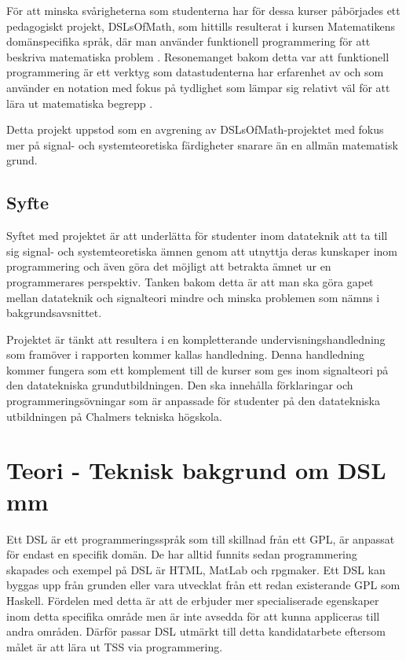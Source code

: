 \documentclass[]{article}
\begin{document}
För att minska svårigheterna som studenterna har för dessa kurser påbörjades
ett pedagogiskt projekt, DSLsOfMath, som hittills resulterat i kursen
Matematikens domänspecifika språk, där man använder funktionell
programmering för att beskriva matematiska problem \cite{kursplan:dslsofmath}.
Resonemanget bakom detta var att funktionell programmering är ett verktyg
som datastudenterna har erfarenhet av och som använder en notation med
fokus på tydlighet som lämpar sig relativt väl för att lära ut matematiska
begrepp \cite{TFPIE15_DSLsofMath_IonescuJansson}.

Detta projekt uppstod som en avgrening av DSLsOfMath-projektet med fokus mer på signal- och systemteoretiska färdigheter snarare än en allmän matematisk grund.

\subsection{Syfte}

%

Syftet med projektet är att underlätta för studenter inom datateknik att
ta till sig signal- och systemteoretiska ämnen genom att utnyttja deras
kunskaper inom programmering och även göra det möjligt att betrakta ämnet ur
en programmerares perspektiv. Tanken bakom detta är att man ska göra gapet
mellan datateknik och signalteori mindre och minska problemen som nämns
i bakgrundsavsnittet.

Projektet är tänkt att resultera i en kompletterande undervisningshandledning som
framöver i rapporten kommer kallas handledning.
Denna handledning kommer fungera som ett komplement till de kurser som ges inom
signalteori på den datatekniska grundutbildningen. Den ska innehålla
förklaringar och programmeringsövningar som är anpassade för studenter på den
datatekniska utbildningen på Chalmers tekniska högskola.

\section{Teori - Teknisk bakgrund om DSL mm}

Ett DSL är ett programmeringsspråk som till skillnad från ett GPL, är anpassat
för endast en specifik domän. De har alltid funnits sedan programmering
skapades och exempel på DSL är HTML, MatLab och rpgmaker. Ett DSL kan
byggas upp från grunden eller vara utvecklat från ett redan existerande GPL
som Haskell. Fördelen med detta är att de erbjuder mer specialiserade egenskaper
inom detta specifika område men är inte avsedda för att kunna appliceras till andra
områden. Därför passar DSL utmärkt till detta kandidatarbete eftersom målet är
att lära ut TSS via programmering.
\end{document}
